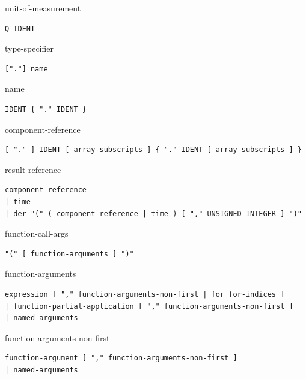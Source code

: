 \begin{production}{unit-of-measurement}
\begin{lstlisting}
Q-IDENT
\end{lstlisting}
\end{production}

\begin{production}{type-specifier}
\begin{lstlisting}
["."] name
\end{lstlisting}
\end{production}

\begin{production}{name}
\begin{lstlisting}
IDENT { "." IDENT }
\end{lstlisting}
\end{production}

\begin{production}{component-reference}
\begin{lstlisting}
[ "." ] IDENT [ array-subscripts ] { "." IDENT [ array-subscripts ] }
\end{lstlisting}
\end{production}

\begin{production}{result-reference}
\begin{lstlisting}
component-reference
| time
| der "(" ( component-reference | time ) [ "," UNSIGNED-INTEGER ] ")"
\end{lstlisting}
\end{production}

\begin{production}{function-call-args}
\begin{lstlisting}
"(" [ function-arguments ] ")"
\end{lstlisting}
\end{production}

\begin{production}{function-arguments}
\begin{lstlisting}
expression [ "," function-arguments-non-first | for for-indices ]
| function-partial-application [ "," function-arguments-non-first ]
| named-arguments
\end{lstlisting}
\end{production}

\begin{production}{function-arguments-non-first}
\begin{lstlisting}
function-argument [ "," function-arguments-non-first ]
| named-arguments
\end{lstlisting}
\end{production}

